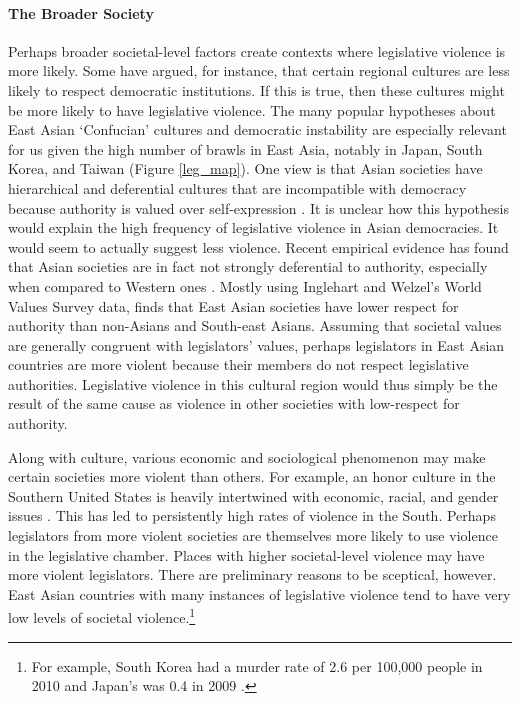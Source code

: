 \documentclass[a4paper]{article}\usepackage[]{graphicx}\usepackage[]{color}
\begin{document}
\paragraph{The Broader Society}

Perhaps broader societal-level factors create contexts where legislative violence is more likely. Some have argued, for instance, that certain regional cultures are less likely to respect democratic institutions. If this is true, then these cultures might be more likely to have legislative violence. The many popular hypotheses about East Asian `Confucian' cultures \citep[]{Inglehart2005, Inglehart2010} and democratic instability are especially relevant for us given the high number of brawls in East Asia, notably in Japan, South Korea, and Taiwan (Figure \ref{leg_map}). One view is that Asian societies have hierarchical and deferential cultures that are incompatible with democracy because authority is valued over self-expression \citep[212-213]{Dalton2005}. It is unclear how this hypothesis would explain the high frequency of legislative violence in Asian democracies. It would seem to actually suggest less violence. Recent empirical evidence has found that Asian societies are in fact not strongly deferential to authority, especially when compared to Western ones \citep{Dalton2005, KimAsianValues2010}. Mostly using Inglehart and Welzel's World Values Survey data, \cite{KimAsianValues2010} finds that East Asian societies have lower respect for authority than non-Asians and South-east Asians. Assuming that societal values are generally congruent with legislators' values, perhaps legislators in East Asian countries are more violent because their members do not respect legislative authorities. Legislative violence in this cultural region would thus simply be the result of the same cause as violence in other societies with low-respect for authority.

Along with culture, various economic and sociological phenomenon may make certain societies more violent than others. For example, an honor culture in the Southern United States is heavily intertwined with economic, racial, and gender issues \citep[]{nisbett1996culture}. This has led to persistently high rates of violence in the South. Perhaps legislators from more violent societies are themselves more likely to use violence in the legislative chamber. Places with higher societal-level violence may have more violent legislators. There are preliminary reasons to be sceptical, however. East Asian countries with many instances of legislative violence tend to have very low levels of societal violence.\footnote{For example, South Korea had a murder rate of 2.6 per 100,000 people in 2010 and Japan's was 0.4 in 2009 \citep{UNMurder2013}.}
\end{document}
